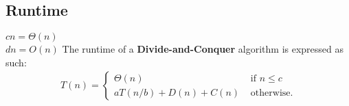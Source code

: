 \subsection*{Runtime}
$cn=\Theta(n)$\\
$dn=O(n)$
\newline\newline
The runtime of a \textbf{Divide-and-Conquer} algorithm is expressed as such:
\begin{align*}
  T(n)=
  \begin{cases}
    \Theta(n)&\textrm{ if }n\leq c\\
    aT(n/b)+D(n)+C(n)&\textrm{ otherwise.}
  \end{cases}
\end{align*}
